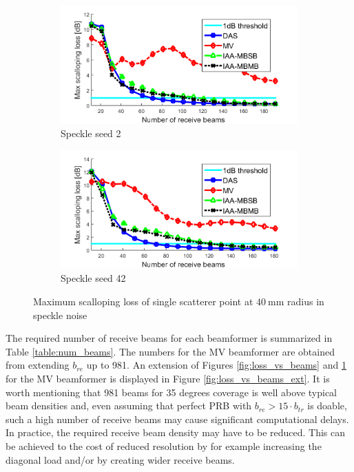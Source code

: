 \begin{figure}[ht]
    \centering
    \begin{subfigure}[t]{\linewidth}
        \includegraphics[width=\linewidth]{./images/results/1/loss_vs_beams_speckle2.png}
        \caption{Speckle seed 2}
    \end{subfigure}
    \quad
    \begin{subfigure}[t]{\linewidth}
        \includegraphics[width=\linewidth]{./images/results/1/loss_vs_beams_speckle42.png}
        \caption{Speckle seed 42}
    \end{subfigure}
	\caption{Maximum scalloping loss of single scatterer point at $40~$mm radius in speckle noise}
	\label{fig:loss_vs_beams_speckle}
\end{figure}

The required number of receive beams for each beamformer is summarized in Table \ref{table:num_beams}. The numbers for the MV beamformer are obtained from extending $b_{re}$ up to 981. An extension of Figures \ref{fig:loss_vs_beams} and \ref{fig:loss_vs_beams_speckle} for the MV beamformer is displayed in Figure \ref{fig:loss_vs_beams_ext}.
It is worth mentioning that 981 beams for 35 degrees coverage is well above typical beam densities and, even assuming that perfect PRB with $b_{re} > 15 \cdot b_{tr}$ is doable, such a high number of receive beams may cause significant computational delays.
In practice, the required receive beam density may have to be reduced. This can be achieved to the cost of reduced resolution by for example increasing the diagonal load and/or by creating wider receive beams.

